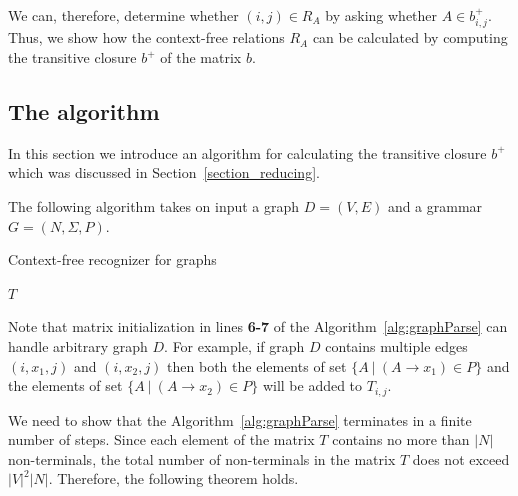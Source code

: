 We can, therefore, determine whether $(i,j) \in R_A$ by asking whether $A \in b^+_{i,j}$. Thus, we show how the context-free relations $R_A$ can be calculated by computing the transitive closure $b^+$ of the matrix $b$.



\subsection{The algorithm} \label{section_algorithm}
In this section we introduce an algorithm for calculating the transitive closure $b^+$ which was discussed in Section~\ref{section_reducing}.

The following algorithm takes on input a graph $D = (V, E)$ and a grammar $G = (N,\Sigma,P)$.

\begin{algorithm}[H]
\begin{algorithmic}[1]
\caption{Context-free recognizer for graphs}
\label{alg:graphParse}
    
    \EndFor    
       
    \EndWhile
\State \Return $T$
\EndFunction
\end{algorithmic}
\end{algorithm}

Note that matrix initialization in lines \textbf{6-7} of the Algorithm~\ref{alg:graphParse} can handle arbitrary graph $D$. For example, if graph $D$ contains multiple edges $(i,x_1,j)$ and $(i,x_2,j)$ then both the elements of set $\{A~|~(A \rightarrow x_1) \in P \}$ and the elements of set $\{A~|~(A \rightarrow x_2) \in P \}$ will be added to $T_{i,j}$.

We need to show that the Algorithm~\ref{alg:graphParse} terminates in a finite number of steps. Since each element of the matrix $T$ contains no more than $|N|$ non-terminals, the total number of non-terminals in the matrix $T$ does not exceed $|V|^2|N|$. Therefore, the following theorem holds.

